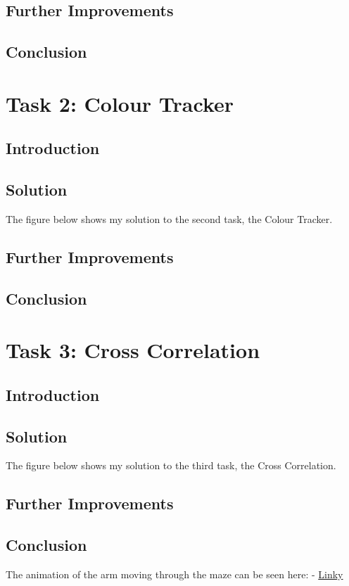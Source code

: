 \documentclass[conference]{IEEEtran}
\begin{document}
\subsection{Further Improvements}

\subsection{Conclusion}

\section{Task 2: Colour Tracker}

\subsection{Introduction}

\subsection{Solution}
The figure below shows my solution to the second task, the Colour Tracker. 

\subsection{Further Improvements}

\subsection{Conclusion}

\section{Task 3: Cross Correlation}

\subsection{Introduction}

\subsection{Solution}
The figure below shows my solution to the third task, the Cross Correlation. 

\subsection{Further Improvements}

\subsection{Conclusion}

The animation of the arm moving through the maze can be seen here: - \href{Link}{Linky}
\end{document}
